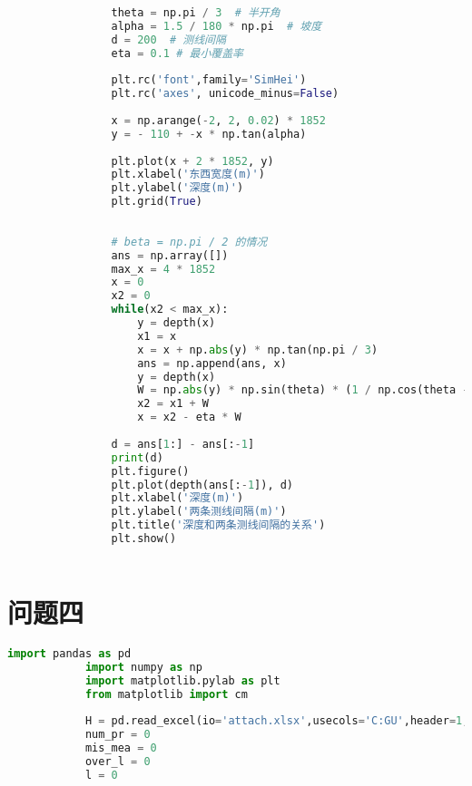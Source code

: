 \documentclass[withoutpreface,bwprint]{cumcmthesis} %
\begin{document}
\begin{appendices}
\begin{lstlisting}[language=python]
                
                theta = np.pi / 3  # 半开角
                alpha = 1.5 / 180 * np.pi  # 坡度
                d = 200  # 测线间隔
                eta = 0.1 # 最小覆盖率
                
                plt.rc('font',family='SimHei')
                plt.rc('axes', unicode_minus=False)
                
                x = np.arange(-2, 2, 0.02) * 1852
                y = - 110 + -x * np.tan(alpha)
                
                plt.plot(x + 2 * 1852, y)
                plt.xlabel('东西宽度(m)')
                plt.ylabel('深度(m)')
                plt.grid(True)
                
                
                # beta = np.pi / 2 的情况
                ans = np.array([])
                max_x = 4 * 1852
                x = 0
                x2 = 0
                while(x2 < max_x):
                    y = depth(x)
                    x1 = x
                    x = x + np.abs(y) * np.tan(np.pi / 3)
                    ans = np.append(ans, x)
                    y = depth(x)
                    W = np.abs(y) * np.sin(theta) * (1 / np.cos(theta - alpha) + 1 / np.cos(theta + alpha)) * np.cos(alpha) # 覆盖宽度
                    x2 = x1 + W
                    x = x2 - eta * W
                
                d = ans[1:] - ans[:-1]
                print(d)
                plt.figure()
                plt.plot(depth(ans[:-1]), d)
                plt.xlabel('深度(m)')
                plt.ylabel('两条测线间隔(m)')
                plt.title('深度和两条测线间隔的关系')
                plt.show()
                
            \end{lstlisting}


            \section{问题四}
            \begin{lstlisting}[language=python]
            import pandas as pd
            import numpy as np
            import matplotlib.pylab as plt
            from matplotlib import cm
            
            H = pd.read_excel(io='attach.xlsx',usecols='C:GU',header=1,names=None).values
            num_pr = 0
            mis_mea = 0
            over_l = 0
            l = 0
            

\end{lstlisting}
\end{appendices}
\end{document}

